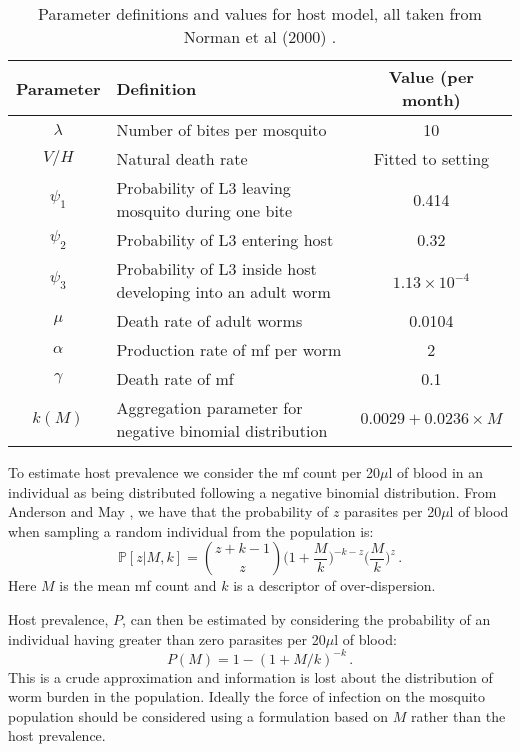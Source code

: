 \documentclass[5p,times]{elsarticle}
\begin{document}
\begin{table*}[t]
\caption{Parameter definitions and values for host model, all taken from Norman et al (2000) \cite{norman2000}.}%
\vspace{.1cm}
\centering %
\begin{tabular}{c l c}%
\hline\hline                        %
Parameter & Definition & Value (per month) \\ [0.5ex]%
\hline                  %
$\lambda$ & Number of bites per mosquito & 10 \\%
$V/H$ & Natural death rate & Fitted to setting \\
$\psi_1$ & Probability of L3 leaving mosquito during one bite & 0.414 \\
$\psi_2$ & Probability of L3 entering host & 0.32 \\
$\psi_3$ & Probability of L3 inside host developing into an adult worm & $1.13\times 10^{-4}$ \\
$\mu$ & Death rate of adult worms & 0.0104 \\
$\alpha$ & Production rate of mf per worm & 2  \\
$\gamma$ & Death rate of mf & 0.1  \\
$k(M)$ & Aggregation parameter for negative binomial distribution & $0.0029+0.0236\times M$ \\[1ex]      %
\hline%
\end{tabular}
\label{table:param_host}%
\end{table*}

To estimate host prevalence we consider the mf count per 20$\mu$l of blood in an individual as being distributed following a negative binomial distribution. From Anderson and May \cite{A&M}, we have that the probability of $z$ parasites per 20$\mu$l of blood when sampling a random individual from the population is:
\begin{equation}
\mathbb{P}[z|M,k] = \binom{z+k-1}{z} \Big(1+\frac{M}{k}\Big)^{-k-z}\Big(\frac{M}{k}\Big)^z\,.
\label{eqn:negbin}
\end{equation}
Here $M$ is the mean mf count and $k$ is a descriptor of over-dispersion.

Host prevalence, $P$, can then be estimated by considering the probability of an individual having greater than zero parasites per 20$\mu$l of blood:
\begin{equation}
P(M) = 1 - (1+M/k)^{-k}\,.
\label{eqn:prev}
\end{equation}
This is a crude approximation and information is lost about the distribution of worm burden in the population. Ideally the force of infection on the mosquito population should be considered using a formulation based on $M$ rather than the host prevalence.
\end{document}
